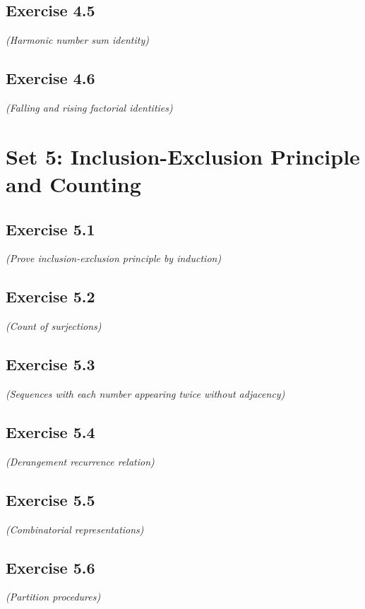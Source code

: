 \documentclass[12pt,a4paper]{article}
\begin{document}
\subsection*{Exercise 4.5}
\textit{(Harmonic number sum identity)}

\vspace{1cm}

\subsection*{Exercise 4.6}
\textit{(Falling and rising factorial identities)}

\vspace{1cm}

\section{Set 5: Inclusion-Exclusion Principle and Counting}

\subsection*{Exercise 5.1}
\textit{(Prove inclusion-exclusion principle by induction)}

\vspace{1cm}

\subsection*{Exercise 5.2}
\textit{(Count of surjections)}

\vspace{1cm}

\subsection*{Exercise 5.3}
\textit{(Sequences with each number appearing twice without adjacency)}

\vspace{1cm}

\subsection*{Exercise 5.4}
\textit{(Derangement recurrence relation)}

\vspace{1cm}

\subsection*{Exercise 5.5}
\textit{(Combinatorial representations)}

\vspace{1cm}

\subsection*{Exercise 5.6}
\textit{(Partition procedures)}

\vspace{1cm}
\end{document}
